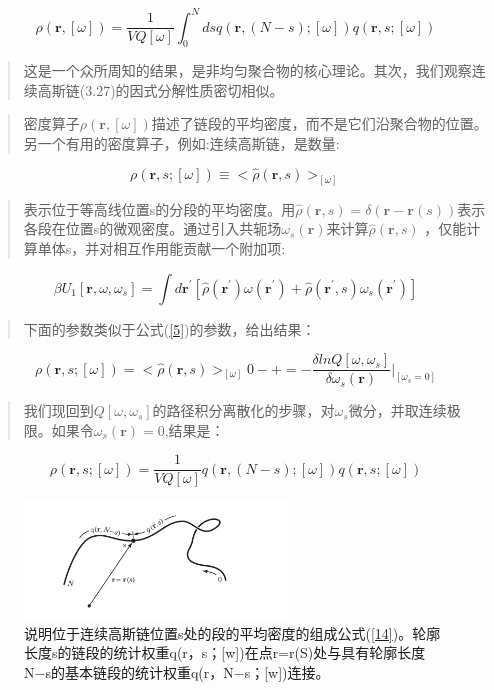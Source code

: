 \begin{equation}\label{10}
\rho(\mathbf{r},[\omega])=\frac{1}{VQ[\omega]}\int_{0}^{N}dsq(\mathbf{r},(N-s);[\omega])q(\mathbf{r},s;[\omega])
\end{equation}
\begin{quotation}
	这是一个众所周知的结果，是非均匀聚合物的核心理论。其次，我们观察连续高斯链(3.27)的因式分解性质密切相似。
\end{quotation}
\begin{quotation}
	密度算子$\rho(\mathbf{r},[\omega])$描述了链段的平均密度，而不是它们沿聚合物的位置。另一个有用的密度算子，例如:连续高斯链，是数量:
\end{quotation}
\begin{equation}\label{11}
\rho(\mathbf{r},s;[\omega])\equiv <\hat{\rho}(\mathbf{r},s)>_{[\omega]}
\end{equation}
\begin{quotation}
	表示位于等高线位置s的分段的平均密度。用$\hat{\rho}(\mathbf{r},s)=\delta(\mathbf{r}-\mathbf{r}(s))$表示各段在位置s的微观密度。通过引入共轭场$\omega_s(\mathbf{r})$来计算$\hat{\rho}(\mathbf{r},s)$
	，仅能计算单体s，并对相互作用能贡献一个附加项:
\end{quotation}
\begin{equation}\label{12}
\beta U_1[\mathbf{r},\omega ,\omega_s]=\int d\mathbf{r}^{'}[\hat{\rho}(\mathbf{r}^{'})\omega (\mathbf{r}^{'})+\hat{\rho}(\mathbf{r}^{'},s)\omega_s(\mathbf{r}^{'})]
\end{equation}
\begin{quotation}
	下面的参数类似于公式(\ref{5})的参数，给出结果：
\end{quotation}
\begin{equation}\label{13}
\rho(\mathbf{r},s;[\omega])=<\hat{\rho}(\mathbf{r},s)>_{[\omega]}0-+
=-\frac{\delta lnQ[\omega,\omega_s]}{\delta \omega_s(\mathbf{r})}|_{[\omega_s=0]}
\end{equation}
\begin{quotation}
	我们现回到$Q[\omega,\omega_s]$的路径积分离散化的步骤，对$\omega_s$微分，并取连续极限。如果令$\omega_s(\mathbf{r})=0$,结果是：
\end{quotation}
\begin{equation}\label{14}
\rho(\mathbf{r},s;[\omega])=\frac{1}{VQ[\omega]}q(\mathbf{r},(N-s);[\omega])q(\mathbf{r},s;[\omega])
\end{equation}
\begin{figure}[ht]
	\centering
	\includegraphics[width=7cm]{32.png}
	\caption{说明位于连续高斯链位置s处的段的平均密度的组成公式(\ref{14})。轮廓长度s的链段的统计权重q(r，s；[w])在点r=r(S)处与具有轮廓长度N−s的基本链段的统计权重q(r，N−s；[w])连接。}
	\label{figure1}
\end{figure}
